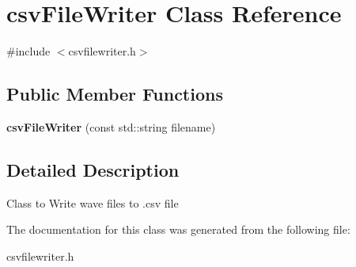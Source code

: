 \hypertarget{classcsvFileWriter}{}\section{csv\+File\+Writer Class Reference}
\label{classcsvFileWriter}


{\ttfamily \#include $<$csvfilewriter.\+h$>$}

\subsection*{Public Member Functions}
\begin{DoxyCompactItemize}
\item 
\mbox{\label{classcsvFileWriter_adcc3ebe8a870b92d7614805ec27f5b33}} 
{\bfseries csv\+File\+Writer} (const std\+::string filename)
\end{DoxyCompactItemize}


\subsection{Detailed Description}
Class to Write wave files to .csv file 

The documentation for this class was generated from the following file\+:\begin{DoxyCompactItemize}
\item 
csvfilewriter.\+h\end{DoxyCompactItemize}
